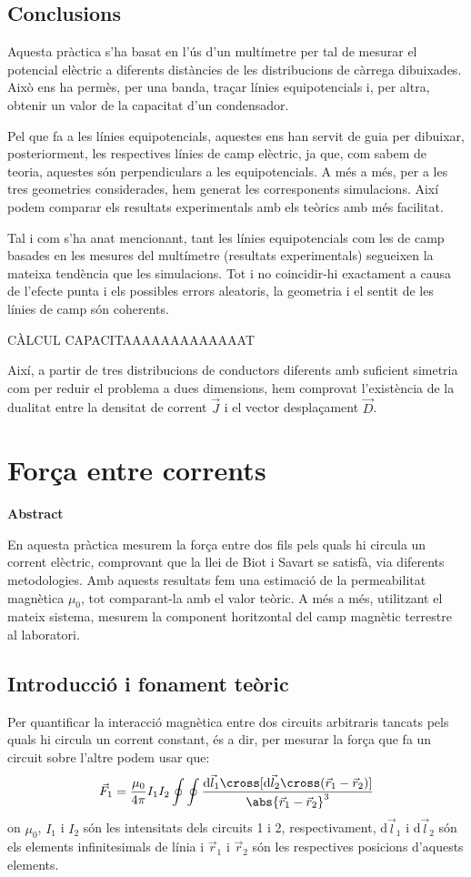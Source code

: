 \documentclass[a4paper,10.5pt]{report}
\newenvironment{chapterabstract}{
	\begin{center}
		\bfseries Abstract
	\end{center}
	\quotation
}{\endquotation}
\begin{document}
\section{Conclusions}
Aquesta pràctica s'ha basat en l'ús d'un multímetre per tal de mesurar el potencial elèctric a diferents distàncies de les distribucions de càrrega dibuixades. Això ens ha permès, per una banda, traçar línies equipotencials i, per altra, obtenir un valor de la capacitat d'un condensador.

Pel que fa a les línies equipotencials, aquestes ens han servit de guia per dibuixar, posteriorment, les respectives línies de camp elèctric, ja que, com sabem de teoria, aquestes són perpendiculars a les equipotencials. A més a més, per a les tres geometries considerades, hem generat les corresponents simulacions. Així podem comparar els resultats experimentals amb els teòrics amb més facilitat.

Tal i com s'ha anat mencionant, tant les línies equipotencials com les de camp basades en les mesures del multímetre (resultats experimentals) segueixen la mateixa tendència que les simulacions. Tot i no coincidir-hi exactament a causa de l'efecte punta i els possibles errors aleatoris, la geometria i el sentit de les línies de camp són coherents.

CÀLCUL CAPACITAAAAAAAAAAAAAT

Així, a partir de tres distribucions de conductors diferents amb suficient simetria com per reduir el problema a dues dimensions, hem comprovat l'existència de la dualitat entre la densitat de corrent $\vec{J}$ i el vector desplaçament $\vec{D}$.

\chapter{Força entre corrents}
\begin{chapterabstract}
	En aquesta pràctica mesurem la força entre dos fils pels quals hi circula un corrent elèctric, comprovant que la llei de Biot i Savart se satisfà, via diferents metodologies. Amb aquests resultats fem una estimació de la permeabilitat magnètica $\mu_0$, tot comparant-la amb el valor teòric. A més a més, utilitzant el mateix sistema, mesurem la component horitzontal del camp magnètic terrestre al laboratori.
\end{chapterabstract}
\section{Introducció i fonament teòric}
Per quantificar la interacció magnètica entre dos circuits arbitraris tancats pels quals hi circula un corrent constant, és a dir, per mesurar la força que fa un circuit sobre l'altre podem usar que:
\begin{equation}
	\vec{F}_1 = \frac{\mu_0}{4\pi}I_1I_2\oint \oint \frac{\mathrm{d}\vec{l}_1\cross[\mathrm{d}\vec{l}_2 \cross (\vec{r}_1-\vec{r}_2)]}{\abs{\vec{r}_1 - \vec{r}_2}^3}\label{eq:2.1}
\end{equation}
on $\mu_0$, $I_1$ i $I_2$ són les intensitats dels circuits 1 i 2, respectivament, d$\vec{l}_1$ i d$\vec{l}_2$ són els elements infinitesimals de línia i $\vec{r}_1$ i $\vec{r}_2$ són les respectives posicions d'aquests elements.
\end{document}
